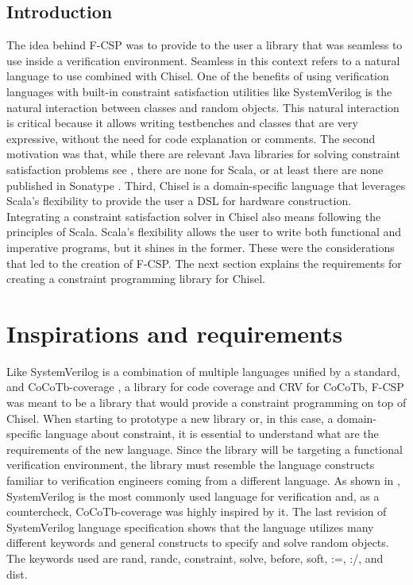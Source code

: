 \subsection{Introduction}
The idea behind F-CSP was to provide to the user a library that was seamless to
use inside a verification environment. Seamless in this context refers to a
natural language to use combined with Chisel. One of the benefits of using
verification languages with built-in constraint satisfaction utilities like
SystemVerilog is the natural interaction between classes and random objects.
This natural interaction is critical because it allows writing testbenches and
classes that are very expressive, without the need for code explanation or
comments. The second motivation was that, while there are relevant Java
libraries for solving constraint satisfaction problems see \cite{prudchoco4,
  online:jacop, online:optaplanner}, there are none for Scala, or at least there
are none published in Sonatype \cite{online:sonatype}. Third, Chisel is a
domain-specific language that leverages Scala's flexibility to provide the user
a DSL for hardware construction. Integrating a constraint satisfaction solver in
Chisel also means following the principles of Scala. Scala's flexibility allows
the user to write both functional and imperative programs, but it shines in the
former. These were the considerations that led to the creation of F-CSP. The
next section explains the requirements for creating a constraint programming
library for Chisel.

\section{Inspirations and requirements}
Like SystemVerilog is a combination of multiple languages unified by a standard,
and CoCoTb-coverage \cite{cieplucha2016new}, a library for code coverage and CRV
for CoCoTb, F-CSP was meant to be a library that would provide a constraint
programming on top of Chisel. When starting to prototype a new library or, in
this case, a domain-specific language about constraint, it is essential to
understand what are the requirements of the new language. Since the library will
be targeting a functional verification environment, the library must resemble
the language constructs familiar to verification engineers coming from a
different language. As shown in \cite{foster2015trends}, SystemVerilog is the
most commonly used language for verification and, as a countercheck,
CoCoTb-coverage was highly inspired by it. The last revision of SystemVerilog
language specification \cite{ieee2017ieee} shows that the language utilizes many
different keywords and general constructs to specify and solve random objects.
The keywords used are rand, randc, constraint, solve, before, soft, :=, :/, and
dist.

